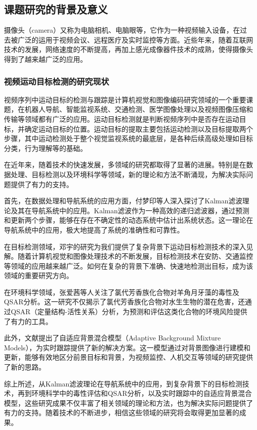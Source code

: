 \subsection{课题研究的背景及意义}

摄像头（camera）又称为电脑相机、电脑眼等，它作为一种视频输入设备，在过去被广泛的运用于视频会议、远程医疗及实时监控等方面。近些年来，随着互联网技术的发展，网络速度的不断提高，再加上感光成像器件技术的成熟，使得摄像头得到了越来越广泛的应用。

\subsubsection{视频运动目标检测的研究现状}

视频序列中运动目标的检测与跟踪是计算机视觉和图像编码研究领域的一个重要课题，在机器人导航、智能监视系统、交通检测、医学图像处理以及视频图像压缩和传输等领域都有广泛的应用。运动目标检测就是判断视频序列中是否存在运动目标，并确定运动目标的位置。运动目标的提取主要包括运动检测以及目标提取两个步骤，其中运动检测处于整个视觉监视系统的最底层，是各种后续高级处理如目标分类，行为理解等的基础。

在近年来，随着技术的快速发展，多领域的研究都取得了显著的进展。特别是在数据处理、目标检测以及环境科学等领域，新的理论和方法不断涌现，为解决实际问题提供了有力的支持。

首先，在数据处理和导航系统的应用方面，付梦印等人深入探讨了Kalman滤波理论及其在导航系统中的应用。Kalman滤波作为一种高效的递归滤波器，通过预测和更新两个步骤，能够在存在不确定性的动态系统中估计出系统状态。这一理论在导航系统中的应用，极大地提高了系统的准确性和可靠性。

在目标检测领域，邓宇的研究为我们提供了复杂背景下运动目标检测技术的深入见解。随着计算机视觉和图像处理技术的不断发展，目标检测技术在安防、交通监控等领域的应用越来越广泛。如何在复杂的背景下准确、快速地检测出目标，成为该领域的重要研究方向。

在环境科学领域，张爱茜等人关注了氯代芳香族化合物对羊角月牙藻的毒性及QSAR分析。这一研究不仅揭示了氯代芳香族化合物对水生生物的潜在危害，还通过QSAR（定量结构-活性关系）分析，为预测和评估这类化合物的环境风险提供了有力的工具。

此外，文献\cite{Stauffer1999}提出了自适应背景混合模型（Adaptive Background Mixture Models），为实时跟踪提供了新的解决方案。这一模型通过对背景图像进行建模和更新，能够有效地区分前景目标和背景，为视频监控、人机交互等领域的研究提供了新的思路。

综上所述，从Kalman滤波理论在导航系统中的应用，到复杂背景下的目标检测技术，再到环境科学中的毒性评估和QSAR分析，以及实时跟踪中的自适应背景混合模型，这些研究成果不仅丰富了相关领域的理论和方法，也为解决实际问题提供了有力的支持。随着技术的不断进步，相信这些领域的研究将会取得更加显著的成果。

